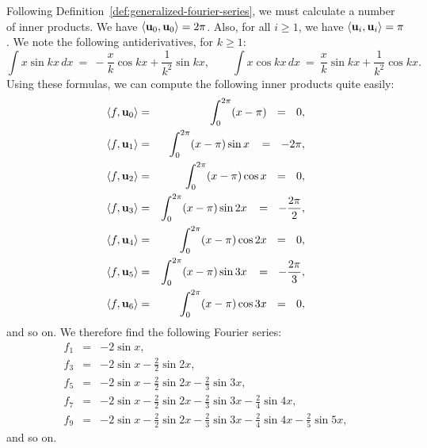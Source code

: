 \begin{solution}
  Following Definition~\ref{def:generalized-fourier-series}, we must
  calculate a number of inner products. We have
  $\iprod{\vect{u}_0,\vect{u}_0}=2\pi$. Also, for all $i\geq 1$, we
  have $\iprod{\vect{u}_i,\vect{u}_i}=\pi$. We note the following
  antiderivatives, for $k\geq 1$:
  \begin{equation*}
    \int x\sin kx\,dx ~=~ -\frac{x}{k}\cos kx + \frac{1}{k^2}\sin kx, \qquad
    \int x\cos kx\,dx ~=~ \frac{x}{k}\sin kx + \frac{1}{k^2}\cos kx.
  \end{equation*}
  Using these formulas, we can compute the following inner products
  quite easily:
  \begin{eqnarray*}
    \iprod{f, \vect{u}_0}
    &=& \int_{0}^{2\pi} (x-\pi)
        ~~=~~ 0, \\
    \iprod{f, \vect{u}_1}
    &=& \int_{0}^{2\pi} (x-\pi)\sin x
        \,~~=~~ -2\pi, \\
    \iprod{f, \vect{u}_2}
    &=& \int_{0}^{2\pi} (x-\pi)\cos x
        ~~=~~ 0, \\
    \iprod{f, \vect{u}_3}
    &=& \int_{0}^{2\pi} (x-\pi)\sin 2x
        \,~~=~~ -\frac{2\pi}{2}, \\
    \iprod{f, \vect{u}_4}
    &=& \int_{0}^{2\pi} (x-\pi)\cos 2x
        ~~=~~ 0, \\
    \iprod{f, \vect{u}_5}
    &=& \int_{0}^{2\pi} (x-\pi)\sin 3x
        \,~~=~~ -\frac{2\pi}{3}, \\
    \iprod{f, \vect{u}_6}
    &=& \int_{0}^{2\pi} (x-\pi)\cos 3x
        ~~=~~ 0,
  \end{eqnarray*}
  and so on. We therefore find the following Fourier series:
  \begin{eqnarray*}
    f_1 &=& -2 \sin x, \\
    f_3 &=& -2 \sin x - \frac{2}{2}\sin 2x, \\
    f_5 &=& -2 \sin x - \frac{2}{2}\sin 2x - \frac{2}{3}\sin 3x, \\
    f_7 &=& -2 \sin x - \frac{2}{2}\sin 2x - \frac{2}{3}\sin 3x - \frac{2}{4}\sin 4x, \\
    f_9 &=& -2 \sin x - \frac{2}{2}\sin 2x - \frac{2}{3}\sin 3x - \frac{2}{4}\sin 4x - \frac{2}{5}\sin 5x,
  \end{eqnarray*}
  and so on. 
\end{solution}

